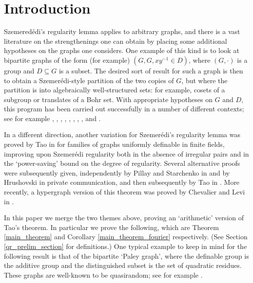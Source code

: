 \documentclass[10pt]{article}
\begin{document}
{\section{Introduction}
Szemeredédi's regularity lemma applies to arbitrary graphs, and there is a vast literature on the strengthenings one can obtain by placing some additional hypotheses on the graphs one considers. One example of this kind is to look at bipartite graphs of the form (for example) $(G,G,xy^{-1}\in D)$, where $(G,\cdot)$ is a group and $D\subseteq G$ is a subset. The desired sort of result for such a graph is then to obtain a Szemerédi-style partition of the two copies of $G$, but where the partition is into algebraically well-structured sets: for example, cosets of a subgroup or translates of a Bohr set. With appropriate hypotheses on $G$ and $D$, this program has been carried out successfully in a number of different contexts; see for example \cite{chung_graham}, \cite{green}, \cite{gowers_groups}, \cite{terry_wolf_1}, \cite{terry_wolf_2}, \cite{alon_fox_zhao}, \cite{conant_pillay_terry_1}, \cite{conant_pillay_terry_2}, and \cite{conant}.


In a different direction, another variation for Szemerédi's regularity lemma was proved by Tao in \cite{tao} for families of graphs uniformly definable in finite fields, improving upon Szemerédi regularity both in the absence of irregular pairs and in the `power-saving' bound on the degree of regularity. Several alternative proofs were subsequently given, independently by Pillay and Starchenko in \cite{pillay_starchenko} and by Hrushovski in private communication, and then subsequently by Tao in \cite{tao_blog}. More recently, a hypergraph version of this theorem was proved by Chevalier and Levi in \cite{chevalier_levi}.

In this paper we merge the two themes above, proving an `arithmetic' version of Tao's theorem. In particular we prove the following, which are Theorem \ref{main_theorem} and Corollary \ref{main_theorem_fourier} respectively. (See Section \ref{qr_prelim_section} for definitions.) One typical example to keep in mind for the following result is that of the bipartite `Paley graph', where the definable group is the additive group and the distinguished subset is the set of quadratic residues. These graphs are well-known to be quasirandom; see for example \cite{zhao}.

}
\end{document}

